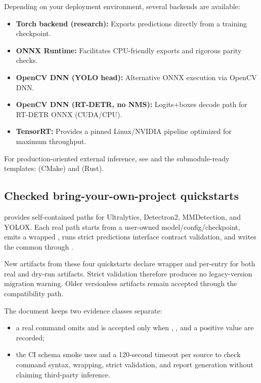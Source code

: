 Depending on your deployment environment, several backends are available:
\begin{itemize}
  \item \textbf{Torch backend (research):} Exports predictions directly from a training checkpoint.
  \item \textbf{ONNX Runtime:} Facilitates CPU-friendly exports and rigorous parity checks.
  \item \textbf{OpenCV DNN (YOLO head):} Alternative ONNX execution via OpenCV DNN.
  \item \textbf{OpenCV DNN (RT-DETR, no NMS):} Logits+boxes decode path for RT-DETR ONNX (CUDA/CPU).
  \item \textbf{TensorRT:} Provides a pinned Linux/NVIDIA pipeline optimized for maximum throughput.
\end{itemize}

For production-oriented external inference, see  and the submodule-ready templates:
 (CMake) and  (Rust).

\subsection{Checked bring-your-own-project quickstarts}

 provides self-contained paths for
Ultralytics, Detectron2, MMDetection, and YOLOX. Each real path starts from a
user-owned model/config/checkpoint, emits a wrapped
, runs strict predictions interface contract
validation, and writes the common  through
.

New artifacts from these four quickstarts declare wrapper
 and per-entry  for both real and
dry-run artifacts. Strict validation therefore produces no legacy-version
migration warning. Older versionless artifacts remain accepted through the
compatibility path.

The document keeps two evidence classes separate:
\begin{itemize}
  \item a real command omits  and is accepted only when
  , , and a
  positive  value are recorded;
  \item the CI schema smoke uses  and a 120-second timeout per
  source to check command syntax, wrapping, strict validation, and report
  generation without claiming third-party inference.
\end{itemize}

